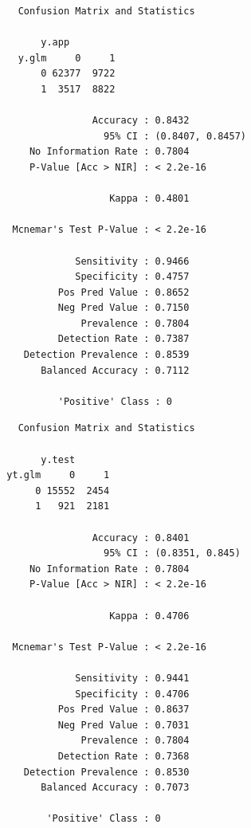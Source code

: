 \documentclass{article}
\begin{document}
\begin{multicols}{2}
    \begin{verbatim}
    Confusion Matrix and Statistics

        y.app
    y.glm     0     1
        0 62377  9722
        1  3517  8822
                                            
                 Accuracy : 0.8432          
                   95% CI : (0.8407, 0.8457)
      No Information Rate : 0.7804          
      P-Value [Acc > NIR] : < 2.2e-16       
                                           
                    Kappa : 0.4801          
                                          
   Mcnemar's Test P-Value : < 2.2e-16       
                                          
              Sensitivity : 0.9466          
              Specificity : 0.4757          
           Pos Pred Value : 0.8652          
           Neg Pred Value : 0.7150          
               Prevalence : 0.7804          
           Detection Rate : 0.7387          
     Detection Prevalence : 0.8539          
        Balanced Accuracy : 0.7112          
                                            
           'Positive' Class : 0
    \end{verbatim}
    \begin{verbatim}
    Confusion Matrix and Statistics

        y.test
  yt.glm     0     1
       0 15552  2454
       1   921  2181
                                           
                 Accuracy : 0.8401         
                   95% CI : (0.8351, 0.845)
      No Information Rate : 0.7804         
      P-Value [Acc > NIR] : < 2.2e-16      
                                           
                    Kappa : 0.4706         
                                           
   Mcnemar's Test P-Value : < 2.2e-16      
                                           
              Sensitivity : 0.9441         
              Specificity : 0.4706         
           Pos Pred Value : 0.8637         
           Neg Pred Value : 0.7031         
               Prevalence : 0.7804         
           Detection Rate : 0.7368         
     Detection Prevalence : 0.8530         
        Balanced Accuracy : 0.7073         
                                           
         'Positive' Class : 0                             
    \end{verbatim}
\end{multicols}
\end{document}
